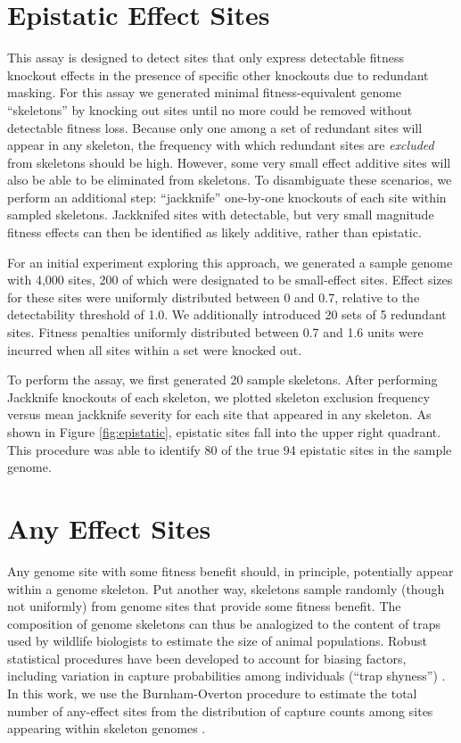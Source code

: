 \section{Epistatic Effect Sites}



This assay is designed to detect sites that only express detectable fitness knockout effects in the presence of specific other knockouts due to redundant masking.
For this assay we generated minimal fitness-equivalent genome ``skeletons'' by knocking out sites until no more could be removed without detectable fitness loss.
Because only one among a set of redundant sites will appear in any skeleton, the frequency with which redundant sites are \textit{excluded} from skeletons should be high.
However, some very small effect additive sites will also be able to be eliminated from skeletons.
To disambiguate these scenarios, we perform an additional step: ``jackknife'' one-by-one knockouts of each site within sampled skeletons.
Jackknifed sites with detectable, but very small magnitude fitness effects can then be identified as likely additive, rather than epistatic.

For an initial experiment exploring this approach, we generated a sample genome with 4,000 sites, 200 of which were designated to be small-effect sites.
Effect sizes for these sites were uniformly distributed between 0 and 0.7, relative to the detectability threshold of 1.0.
We additionally introduced 20 sets of 5 redundant sites.
Fitness penalties uniformly distributed between 0.7 and 1.6 units were incurred when all sites within a set were knocked out.

To perform the assay, we first generated 20 sample skeletons.
After performing Jackknife knockouts of each skeleton, we plotted skeleton exclusion frequency versus mean jackknife severity for each site that appeared in any skeleton.
As shown in Figure \ref{fig:epistatic}, epistatic sites fall into the upper right quadrant.
This procedure was able to identify 80 of the true 94 epistatic sites in the sample genome.

\section{Any Effect Sites}

Any genome site with some fitness benefit should, in principle, potentially appear within a genome skeleton.
Put another way, skeletons sample randomly (though not uniformly) from genome sites that provide some fitness benefit.
The composition of genome skeletons can thus be analogized to the content of traps used by wildlife biologists to estimate the size of animal populations.
Robust statistical procedures have been developed to account for biasing factors, including variation in capture probabilities among individuals (``trap shyness'') \citep{amstrup2010handbook}.
In this work, we use the Burnham-Overton procedure to estimate the total number of any-effect sites from the distribution of capture counts among sites appearing within skeleton genomes \citep{burnham1979robust}.

